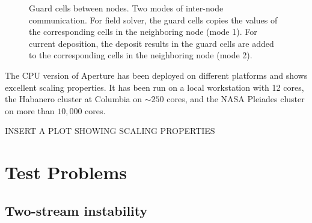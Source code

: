 \begin{figure}[h]
  \centering
  \caption[Guard cells between nodes.]{Guard cells between nodes. Two modes of
    inter-node communication. For field solver, the guard cells copies the values
  of the corresponding cells in the neighboring node (mode 1). For current
  deposition, the deposit results in the guard cells are added to the
  corresponding cells in the neighboring node (mode 2).}
  \label{fig:guard-cells}
\end{figure}

The CPU version of Aperture has been deployed on different platforms and shows
excellent scaling properties. It has been run on a local workstation with 12
cores, the Habanero cluster at Columbia on $\sim 250$ cores, and the NASA
Pleiades cluster on more than $10,000$ cores.

INSERT A PLOT SHOWING SCALING PROPERTIES



\section{Test Problems}
\label{sec:test-problems}

\subsection{Two-stream instability}
\label{sec:test-two-stream}

